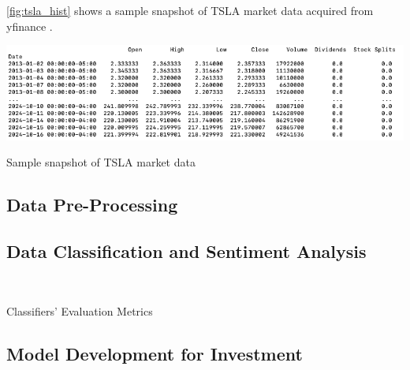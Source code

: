 \documentclass[twocolumn,10pt]{article}
\makeatletter
\newenvironment{tablehere}
  {\def\@captype{table}}
  {}
\newenvironment{figurehere}
  {\def\@captype{figure}}
  {}
\makeatother
\begin{document}
\begin{multicols}{2}
\begin{flushleft}
	\cref{fig:tsla_hist} shows a sample snapshot of TSLA market data acquired from yfinance \cite{yfin}.
	
	\begin{figurehere}
		\centering
		\includegraphics[width=\linewidth]{images/tsla_hist.png}
		\caption{Sample snapshot of TSLA market data}
		\label{fig:tsla_hist}
	\end{figurehere}
	
	\subsection{Data Pre-Processing} \label{data_preprocessing}
			
	\subsection{Data Classification and Sentiment Analysis} \label{class_model_analysis}
	
	\mbox{}\\
	\begin{tablehere}
		\centering
		\caption{Classifiers' Evaluation Metrics}
		\label{tab:classevalmetrics}
	\end{tablehere}

	\subsection{Model Development for Investment} \label{investment_model_dev}
	

\end{flushleft}
\end{multicols}
\end{document}
